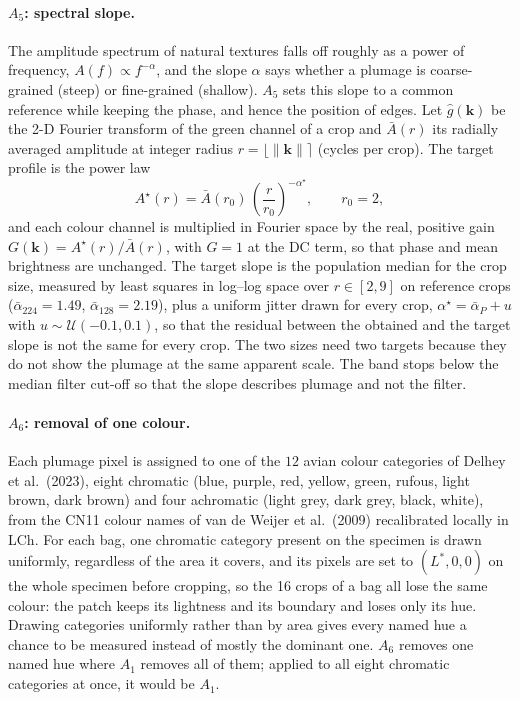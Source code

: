 \paragraph{$A_5$: spectral slope.}
The amplitude spectrum of natural textures falls off roughly as a power of
frequency, $A(f) \propto f^{-\alpha}$, and the slope $\alpha$ says whether a
plumage is coarse-grained (steep) or fine-grained (shallow). $A_5$ sets this
slope to a common reference while keeping the phase, and hence the position of
edges. Let $\hat g(\mathbf{k})$ be the 2-D Fourier transform of the green
channel of a crop and $\bar A(r)$ its radially averaged amplitude at integer
radius $r = \lfloor \lVert\mathbf{k}\rVert \rceil$ (cycles per crop). The target
profile is the power law
\begin{equation}
  A^\star(r) = \bar A(r_0)\,\left(\frac{r}{r_0}\right)^{-\alpha^\star}, \qquad r_0 = 2,
\end{equation}
and each colour channel is multiplied in Fourier space by the real, positive
gain $G(\mathbf{k}) = A^\star(r) / \bar A(r)$, with $G = 1$ at the DC term, so
that phase and mean brightness are unchanged. The target slope is the
population median for the crop size, measured by least squares in log--log
space over $r \in [2, 9]$ on reference crops ($\bar\alpha_{224} = 1.49$,
$\bar\alpha_{128} = 2.19$), plus a uniform jitter drawn for every crop,
$\alpha^\star = \bar\alpha_P + u$ with $u \sim \mathcal{U}(-0.1, 0.1)$, so that
the residual between the obtained and the target slope is not the same for every crop. The two sizes need two
targets because they do not show the plumage at the same apparent scale. The
band stops below the median filter cut-off so that the slope describes plumage
and not the filter.

\paragraph{$A_6$: removal of one colour.}
Each plumage pixel is assigned to one of the $12$ avian colour categories of
Delhey et al.\ (2023), eight chromatic (blue, purple, red, yellow, green,
rufous, light brown, dark brown) and four achromatic (light grey, dark grey,
black, white), from the CN11 colour names of van de Weijer et al.\ (2009)
recalibrated locally in LCh. For each bag, one chromatic category present on
the specimen is drawn uniformly, regardless of the area it covers, and its
pixels are set to $(L^*, 0, 0)$ on the whole specimen before cropping, so the
16 crops of a bag all lose the same colour: the patch keeps its lightness and its
boundary and loses only its hue. Drawing categories uniformly rather than by
area gives every named hue a chance to be measured instead of mostly the
dominant one. $A_6$ removes one named hue where $A_1$ removes all of them; applied
to all eight chromatic categories at once, it would be $A_1$.

